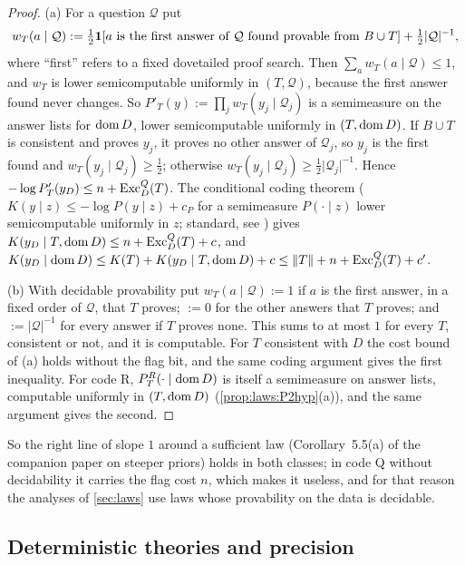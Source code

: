 \begin{proof}
(a) For a question $\mathcal Q$ put
\[w_T(a\mid\mathcal Q):=\tfrac12\mathbf{1}[a\text{ is the first answer of }\mathcal Q\text{ found provable from }B\cup T]+\tfrac12\lvert\mathcal Q\rvert^{-1},\]
where ``first'' refers to a fixed dovetailed proof search. Then $\sum_aw_T(a\mid\mathcal Q)\le1$, and $w_T$ is lower semicomputable uniformly in $(T,\mathcal Q)$, because the first answer found never changes. So $P'_T(y):=\prod_jw_T(y_j\mid\mathcal Q_j)$ is a semimeasure on the answer lists for $\operatorname{dom} D$, lower semicomputable uniformly in $(T,\operatorname{dom} D)$. If $B\cup T$ is consistent and proves $y_j$, it proves no other answer of $\mathcal Q_j$, so $y_j$ is the first found and $w_T(y_j\mid\mathcal Q_j)\ge\frac12$; otherwise $w_T(y_j\mid\mathcal Q_j)\ge\frac12\lvert\mathcal Q_j\rvert^{-1}$. Hence $-\log P'_T(y_D)\le n+\mathrm{Exc}^Q_D(T)$. The conditional coding theorem ($K(y\mid z)\le-\log P(y\mid z)+c_P$ for a semimeasure $P(\cdot\mid z)$ lower semicomputable uniformly in $z$; standard, see \citealp{li2008introduction}) gives $K(y_D\mid T,\operatorname{dom} D)\le n+\mathrm{Exc}^Q_D(T)+c$, and $K(y_D\mid\operatorname{dom} D)\le K(T)+K(y_D\mid T,\operatorname{dom} D)+c\le\lVert T\rVert+n+\mathrm{Exc}^Q_D(T)+c'$.

(b) With decidable provability put $w_T(a\mid\mathcal Q):=1$ if $a$ is the first answer, in a fixed order of $\mathcal Q$, that $T$ proves; $:=0$ for the other answers that $T$ proves; and $:=\lvert\mathcal Q\rvert^{-1}$ for every answer if $T$ proves none. This sums to at most $1$ for every $T$, consistent or not, and it is computable. For $T$ consistent with $D$ the cost bound of (a) holds without the flag bit, and the same coding argument gives the first inequality. For code R, $P^R_T(\cdot\mid\operatorname{dom} D)$ is itself a semimeasure on answer lists, computable uniformly in $(T,\operatorname{dom} D)$ (\cref{prop:laws:P2hyp}(a)), and the same argument gives the second.
\end{proof}

So the right line of slope $1$ around a sufficient law (Corollary~5.5(a) of the companion paper on steeper priors) holds in both classes; in code Q without decidability it carries the flag cost $n$, which makes it useless, and for that reason the analyses of \cref{sec:laws} use laws whose provability on the data is decidable.

\subsection{Deterministic theories and precision}\label{app:laws:precision}

